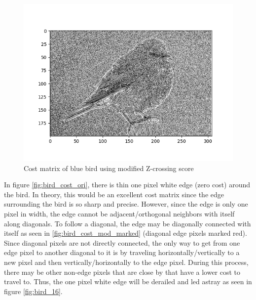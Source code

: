 \documentclass[11pt]{article}
\begin{document}
\begin{figure}[H]
	\centering
	\includegraphics{Cost_Bird_Modified.png}
	\caption{\label{fig:bird_cost_mod}Cost matrix of blue bird using modified Z-crossing score}
\end{figure}
In figure \ref{fig:bird_cost_ori}, there is thin one pixel white edge (zero cost) around the bird. In theory, this would be an excellent cost matrix since the edge surrounding the bird is so sharp and precise. However, since the edge is only one pixel in width, the edge cannot be adjacent/orthogonal neighbors with itself along diagonals. To follow a diagonal, the edge may be diagonally connected with itself as seen in \ref{fig:bird_cost_mod_marked} (diagonal edge pixels marked red). Since diagonal pixels are not directly connected, the only way to get from one edge pixel to another diagonal to it is by traveling horizontally/vertically to a new pixel and then vertically/horizontally to the edge pixel. During this process, there may be other non-edge pixels that are close by that have a lower cost to travel to. Thus, the one pixel white edge will be derailed and led astray as seen in figure \ref{fig:bird_16}.
\end{document}
